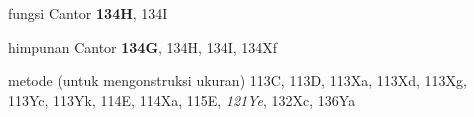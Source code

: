 \indexmedskip















fungsi Cantor {\bf 134H}, 134I



himpunan Cantor {\bf 134G}, 134H, 134I, 134Xf








\indexheader{\Caratheodory}


metode \Caratheodory (untuk mengonstruksi ukuran) 113C, 113D, 113Xa, 113Xd,
113Xg, 113Yc, 113Yk, 114E, 114Xa, 115E, {\it 121Ye},
132Xc, 136Ya












































































